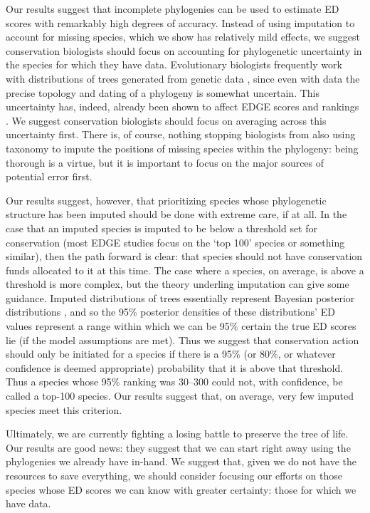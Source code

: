 \documentclass[12pt,english]{article}
\begin{document}
Our results suggest that incomplete phylogenies can be used to
estimate ED scores with remarkably high degrees of accuracy. Instead
of using imputation to account for missing species, which we show has
relatively mild effects, we suggest conservation biologists should
focus on accounting for phylogenetic uncertainty in the species for
which they have data. Evolutionary biologists frequently work with
distributions of trees generated from genetic data \autocite[reviewed
in][]{Huelsenbeck2001,Bollback2005}, since even with data the precise
topology and dating of a phylogeny is somewhat uncertain. This
uncertainty has, indeed, already been shown to affect EDGE scores and
rankings \autocite{Pearse2015}. We suggest conservation biologists
should focus on averaging across this uncertainty first. There is, of
course, nothing stopping biologists from also using taxonomy to impute
the positions of missing species within the phylogeny: being thorough
is a virtue, but it is important to focus on the major sources of
potential error first.

Our results suggest, however, that prioritizing species whose
phylogenetic structure has been imputed should be done with extreme
care, if at all. In the case that an imputed species is imputed to be
below a threshold set for conservation (most EDGE studies focus on the
`top 100' species or something similar), then the path forward is
clear: that species should not have conservation funds allocated to it
at this time. The case where a species, on average, is above a
threshold is more complex, but the theory underling imputation can
give some guidance. Imputed distributions of trees essentially
represent Bayesian posterior distributions \autocite{Kuhn2011}, and so
the 95\% posterior densities of these distributions' ED values
represent a range within which we can be 95\% certain the true ED
scores lie (if the model assumptions are met). Thus we suggest that
conservation action should only be initiated for a species if there is
a 95\% (or 80\%, or whatever confidence is deemed appropriate)
probability that it is above that threshold. Thus a species whose 95\%
ranking was 30--300 could not, with confidence, be called a top-100
species. Our results suggest that, on average, very few imputed
species meet this criterion.

Ultimately, we are currently fighting a losing battle to preserve the
tree of life. Our results are good news: they suggest that we can
start right away using the phylogenies we already have in-hand. We
suggest that, given we do not have the resources to save everything,
we should consider focusing our efforts on those species whose ED
scores we can know with greater certainty: those for which we have
data.
\end{document}
